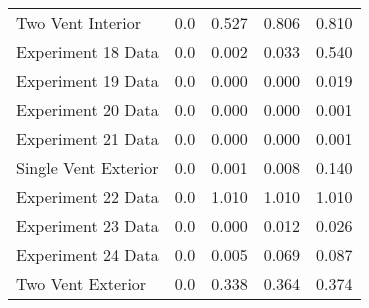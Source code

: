 \begin{tabular}{lrrrr}
Two Vent Interior    &       0.0 &            0.527 &            0.806 &      0.810 \\
Experiment 18 Data   &       0.0 &            0.002 &            0.033 &      0.540 \\
Experiment 19 Data   &       0.0 &            0.000 &            0.000 &      0.019 \\
Experiment 20 Data   &       0.0 &            0.000 &            0.000 &      0.001 \\
Experiment 21 Data   &       0.0 &            0.000 &            0.000 &      0.001 \\
Single Vent Exterior &       0.0 &            0.001 &            0.008 &      0.140 \\
Experiment 22 Data   &       0.0 &            1.010 &            1.010 &      1.010 \\
Experiment 23 Data   &       0.0 &            0.000 &            0.012 &      0.026 \\
Experiment 24 Data   &       0.0 &            0.005 &            0.069 &      0.087 \\
Two Vent Exterior    &       0.0 &            0.338 &            0.364 &      0.374 \\
\bottomrule
\end{tabular}
